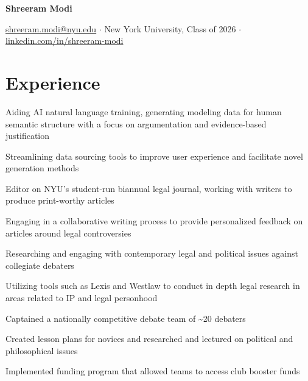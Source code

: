 \documentclass[letterpaper]{resume-shreeram}
\begin{document}
\begin{center}
  {\Huge \bfseries Shreeram Modi}

  \href{mailto:shreeram.modi@nyu.edu}{shreeram.modi@nyu.edu}
  $\cdot$
  New York University, Class of 2026
  $\cdot$
  \href{https://linkedin.com/in/shreeram-modi}{linkedin.com/in/shreeram-modi}
\end{center}

\section{Experience}

\begin{compactitem}
  \item Aiding AI natural language training, generating modeling data
    for human semantic structure with a focus on argumentation and
    evidence-based justification

  \item Streamlining data sourcing tools to improve user experience and
    facilitate novel generation methods
\end{compactitem}

\begin{compactitem}
  \item Editor on NYU's student-run biannual legal journal, working with
    writers to produce print-worthy articles

  \item Engaging in a collaborative writing process to provide
    personalized feedback on articles around legal controversies
\end{compactitem}

\begin{compactitem}
  \item Researching and engaging with contemporary legal and political
    issues against collegiate debaters

  \item Utilizing tools such as Lexis and Westlaw to conduct in depth
    legal research in areas related to IP and legal personhood
\end{compactitem}

\begin{compactitem}
    \item Captained a nationally competitive debate team of
      \textasciitilde{}20 debaters

    \item Created lesson plans for novices and researched and lectured on
      political and philosophical issues

    \item Implemented funding program that allowed teams to access club
      booster funds
\end{compactitem}
\end{document}
